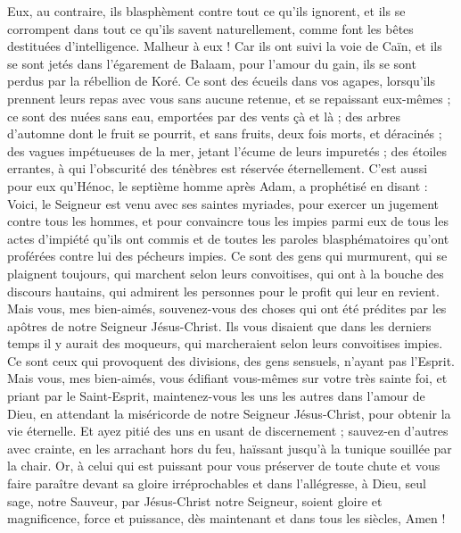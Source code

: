 \begin{multicols}{2}
Eux, au contraire, ils blasphèment contre tout ce qu'ils ignorent, et ils se corrompent dans tout ce qu'ils savent naturellement, comme font les bêtes destituées d'intelligence.
Malheur à eux ! Car ils ont suivi la voie de Caïn, et ils se sont jetés dans l’égarement de Balaam, pour l’amour du gain, ils se sont perdus par la rébellion de Koré{}.
Ce sont des écueils dans vos agapes, lorsqu’ils prennent leurs repas avec vous sans aucune retenue, et se repaissant eux-mêmes ; ce sont des nuées sans eau, emportées par des vents çà et là ; des arbres d’automne dont le fruit se pourrit, et sans fruits, deux fois morts, et déracinés ;
des vagues impétueuses de la mer, jetant l'écume de leurs impuretés ; des étoiles errantes, à qui l'obscurité des ténèbres est réservée éternellement.
C’est aussi pour eux qu’Hénoc, le septième homme après Adam, a prophétisé en disant :
Voici, le Seigneur est venu avec ses saintes myriades, pour exercer un jugement contre tous les hommes, et pour convaincre tous les impies parmi eux de tous les actes d'impiété qu’ils ont commis et de toutes les paroles blasphématoires qu’ont proférées contre lui des pécheurs impies.
Ce sont des gens qui murmurent, qui se plaignent toujours, qui marchent selon leurs convoitises, qui ont à la bouche des discours hautains, qui admirent les personnes pour le profit qui leur en revient.
Mais vous, mes bien-aimés, souvenez-vous des choses qui ont été prédites par les apôtres de notre Seigneur Jésus-Christ.
Ils vous disaient que dans les derniers temps il y aurait des moqueurs, qui marcheraient selon leurs convoitises impies.
Ce sont ceux qui provoquent des divisions, des gens sensuels, n'ayant pas l'Esprit.
Mais vous, mes bien-aimés, vous édifiant vous-mêmes sur votre très sainte foi, et priant par le Saint-Esprit,
maintenez-vous les uns les autres dans l'amour de Dieu, en attendant la miséricorde de notre Seigneur Jésus-Christ, pour obtenir la vie éternelle.
Et ayez pitié des uns en usant de discernement ;
sauvez-en d’autres avec crainte, en les arrachant hors du feu, haïssant jusqu’à la tunique souillée par la chair.
\TextTitle{[Conclusion]}
Or, à celui qui est puissant pour vous préserver de toute chute et vous faire paraître devant sa gloire irréprochables et dans l’allégresse,
à Dieu, seul sage, notre Sauveur, par Jésus-Christ notre Seigneur, soient gloire et magnificence, force et puissance, dès maintenant et dans tous les siècles, Amen !
\PPE{}
\end{multicols}
